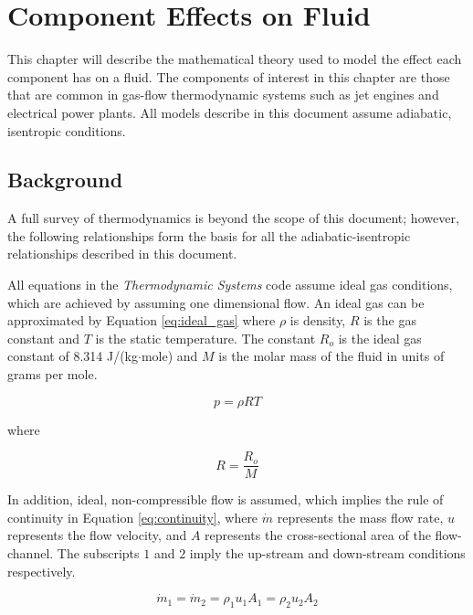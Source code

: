 \chapter{Component Effects on Fluid}

This chapter will describe the mathematical theory used to model the effect each component has
on a fluid.  The components of interest in this chapter are those that are
common in gas-flow thermodynamic systems such as jet engines and electrical power plants.
All models describe in this document assume adiabatic, isentropic conditions.

\section{Background}
A full survey of thermodynamics is beyond the scope of this document; however, the following
relationships form the basis for all the adiabatic-isentropic relationships described in this document.

All equations in the {\emph{Thermodynamic Systems}} code assume ideal gas conditions, 
which are achieved by assuming one dimensional flow.  An ideal gas can be approximated by
Equation \ref{eq:ideal_gas} where $\rho$ is density, $R$ is the gas constant and $T$ is the static
temperature.  The constant $R_o$ is the ideal gas constant of 8.314 J/(kg$\cdot$mole) and $M$
is the molar mass of the fluid in units of grams per mole.

\begin{equation}
\label{eq:ideal_gas}
p=\rho RT
\end{equation}

\noindent where

\begin{equation}
R=\frac{R_o}{M}
\end{equation}

\noindent In addition, ideal, non-compressible flow is assumed, which implies the rule of continuity in Equation \ref{eq:continuity}, 
where $\dot{m}$ represents the mass flow rate, $u$ represents the flow velocity, and $A$ represents
the cross-sectional area of the flow-channel.  The subscripts $1$ and $2$ imply the up-stream and down-stream conditions respectively.

\begin{equation}
\label{eq:continuity}
\dot{m}_1 = \dot{m}_2 = \rho_1u_1A_1 = \rho_2u_2A_2
\end{equation}

